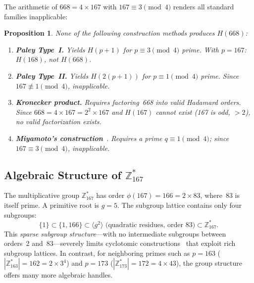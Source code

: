 \documentclass[11pt,a4paper]{article}
\newtheorem{proposition}[theorem]{Proposition}
\newcommand{\ZZ}{\mathbb{Z}}
\begin{document}
The arithmetic of $668 = 4 \times 167$ with $167 \equiv 3 \pmod{4}$
renders all standard families inapplicable:

\begin{proposition}\label{prop:classical}
  None of the following construction methods produces $H(668)$:
  \begin{enumerate}
    \item \textbf{Paley Type~I.}  Yields $H(p+1)$ for $p \equiv 3
      \pmod{4}$ prime.  With $p = 167$: $H(168)$, not $H(668)$.
    \item \textbf{Paley Type~II.}  Yields $H(2(p+1))$ for $p \equiv 1
      \pmod{4}$ prime.  Since $167 \not\equiv 1 \pmod{4}$, inapplicable.
    \item \textbf{Kronecker product.}  Requires factoring~668 into valid
      Hadamard orders.  Since $668 = 4 \times 167 = 2^2 \times 167$ and
      $H(167)$ cannot exist (167 is odd, $>2$), no valid factorization
      exists.
    \item \textbf{Miyamoto's construction}~\cite{miyamoto1991hadamard}.
      Requires a prime $q \equiv 1 \pmod{4}$; since $167 \equiv 3
      \pmod{4}$, inapplicable.
  \end{enumerate}
\end{proposition}

\subsection{Algebraic Structure of \texorpdfstring{$\ZZ_{167}^*$}{Z*\_167}}\label{sec:group}

The multiplicative group $\ZZ_{167}^*$ has order $\phi(167) = 166 = 2
\times 83$, where~83 is itself prime.  A primitive root is $g = 5$.  The
subgroup lattice contains only four subgroups:
\begin{equation}\label{eq:subgroups}
  \{1\} \subset \{1, 166\} \subset
  \langle g^2 \rangle \text{ (quadratic residues, order 83)} \subset
  \ZZ_{167}^*.
\end{equation}
This \emph{sparse subgroup structure}---with no intermediate subgroups
between orders~2 and~83---severely limits cyclotomic
constructions~\cite{seberry2020hadamard_monograph} that exploit rich
subgroup lattices.  In contrast, for neighboring primes such as $p = 163$
($|\ZZ_{163}^*| = 162 = 2 \times 3^4$) and $p = 173$ ($|\ZZ_{173}^*| =
172 = 4 \times 43$), the group structure offers many more algebraic
handles.

\end{document}
